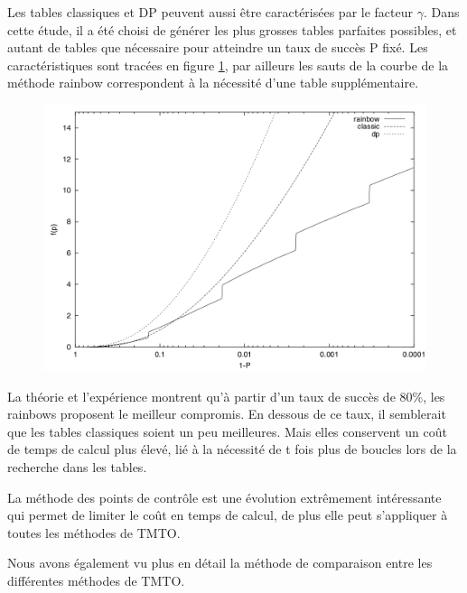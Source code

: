 	Les tables classiques et DP peuvent aussi être caractérisées par le facteur $\gamma$. Dans cette étude, il a été choisi de générer les plus grosses tables parfaites possibles, et autant de tables que nécessaire pour atteindre un taux de succès P fixé. Les caractéristiques sont tracées en figure \ref{fig:TMTO_carac}, par ailleurs les sauts de la courbe de la méthode \gls{rainbow} correspondent à la nécessité d'une table supplémentaire.

	\begin{figure}[H]
		\centering
		\includegraphics[scale=0.25]{graph_gamma_P.png}
		\label{fig:TMTO_carac}
	\end{figure}

	La théorie et l'expérience montrent qu'à partir d'un taux de succès de 80\%, les \glspl{rainbow} proposent le meilleur compromis. En dessous de ce taux, il semblerait que les tables classiques soient un peu meilleures. Mais elles conservent un coût de temps de calcul plus élevé, lié à la nécessité de t fois plus de boucles lors de la recherche dans les tables.


	La méthode des points de contrôle est une évolution extrêmement intéressante qui permet de limiter le coût en temps de calcul, de plus elle peut s'appliquer à toutes les méthodes de \gls{TMTO}.

	\bigskip

	Nous avons également vu plus en détail la méthode de comparaison entre les différentes méthodes de \gls{TMTO}.

\endinput{}
